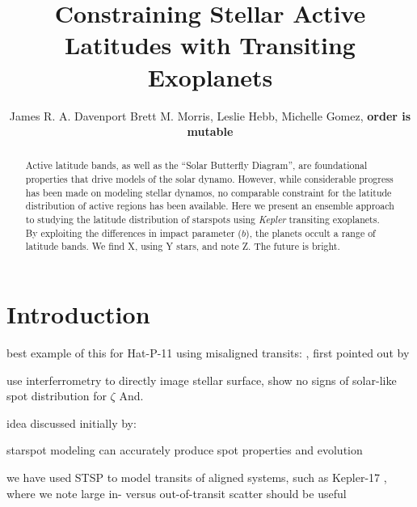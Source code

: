 \documentclass[twocolumn]{aastex6}
\newcommand{\Kepler}{\textsl{Kepler}\xspace}
\begin{document}
\title{Constraining Stellar Active Latitudes with Transiting Exoplanets}


\author{
	James R. A. Davenport
	Brett M. Morris,
	Leslie Hebb, 
	Michelle Gomez,
	{\bf order is mutable}
	}




\begin{abstract}
Active latitude bands, as well as the ``Solar Butterfly Diagram'', are foundational properties that drive models of the solar dynamo. However, while considerable progress has been made on modeling stellar dynamos, no comparable constraint for the latitude distribution of active regions has been available. Here we present an ensemble approach to studying the latitude distribution of starspots using \Kepler transiting exoplanets. By exploiting the differences in impact parameter ($b$), the planets occult a range of latitude bands. We find X, using Y stars, and note Z. The future is bright.
\end{abstract}



\section{Introduction}
\label{sec:intro}

best example of this for Hat-P-11 using misaligned transits:
\cite{morris2017}, first pointed out by \cite{sanchis-ojeda2011}

\cite{roettenbacher2016} use interferrometry to directly image stellar surface, show no signs of solar-like spot distribution for $\zeta$ And.


idea discussed initially by:
\cite{gomez2015}

starspot modeling can accurately produce spot properties and evolution
\cite{davenport2015b}

we have used STSP to model transits of aligned systems, such as Kepler-17
\cite{davenport_phd}, where we note large in- versus out-of-transit scatter should be useful
\end{document}
